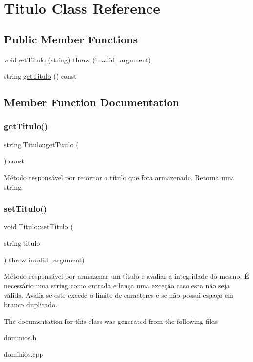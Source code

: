 \hypertarget{classTitulo}{}\section{Titulo Class Reference}
\label{classTitulo}
\subsection*{Public Member Functions}
\begin{DoxyCompactItemize}
\item 
void \hyperlink{classTitulo_ac4b3e70d24f498a9085ae9d01d51ef12}{set\+Titulo} (string)  throw (invalid\+\_\+argument)
\item 
string \hyperlink{classTitulo_ad13d7166263fe5b8053532a820165390}{get\+Titulo} () const
\end{DoxyCompactItemize}


\subsection{Member Function Documentation}
\mbox{\label{classTitulo_ad13d7166263fe5b8053532a820165390}} 
\subsubsection{\texorpdfstring{get\+Titulo()}{getTitulo()}}
{\footnotesize\ttfamily string Titulo\+::get\+Titulo (\begin{DoxyParamCaption}{ }\end{DoxyParamCaption}) const\hspace{0.3cm}{\ttfamily [inline]}}

Método responsável por retornar o título que fora armazenado. Retorna uma string. \mbox{\label{classTitulo_ac4b3e70d24f498a9085ae9d01d51ef12}} 
\subsubsection{\texorpdfstring{set\+Titulo()}{setTitulo()}}
{\footnotesize\ttfamily void Titulo\+::set\+Titulo (\begin{DoxyParamCaption}\item[{string}]{titulo }\end{DoxyParamCaption}) throw  invalid\+\_\+argument) }

Método responsável por armazenar um título e avaliar a integridade do mesmo. É necessário uma string como entrada e lança uma exceção caso esta não seja válida. Avalia se este excede o limite de caracteres e se não possui espaço em branco duplicado. 

The documentation for this class was generated from the following files\+:\begin{DoxyCompactItemize}
\item 
dominios.\+h\item 
dominios.\+cpp\end{DoxyCompactItemize}
